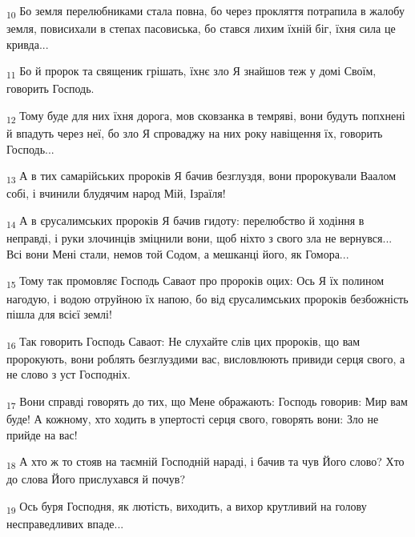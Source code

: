 \begin{tcolorbox}
\textsubscript{10} Бо земля перелюбниками стала повна, бо через прокляття потрапила в жалобу земля, повисихали в степах пасовиська, бо стався лихим їхній біг, їхня сила це кривда...
\end{tcolorbox}
\begin{tcolorbox}
\textsubscript{11} Бо й пророк та священик грішать, їхнє зло Я знайшов теж у домі Своїм, говорить Господь.
\end{tcolorbox}
\begin{tcolorbox}
\textsubscript{12} Тому буде для них їхня дорога, мов сковзанка в темряві, вони будуть попхнені й впадуть через неї, бо зло Я спроваджу на них року навіщення їх, говорить Господь...
\end{tcolorbox}
\begin{tcolorbox}
\textsubscript{13} А в тих самарійських пророків Я бачив безглуздя, вони пророкували Ваалом собі, і вчинили блудячим народ Мій, Ізраїля!
\end{tcolorbox}
\begin{tcolorbox}
\textsubscript{14} А в єрусалимських пророків Я бачив гидоту: перелюбство й ходіння в неправді, і руки злочинців зміцнили вони, щоб ніхто з свого зла не вернувся... Всі вони Мені стали, немов той Содом, а мешканці його, як Гомора...
\end{tcolorbox}
\begin{tcolorbox}
\textsubscript{15} Тому так промовляє Господь Саваот про пророків оцих: Ось Я їх полином нагодую, і водою отруйною їх напою, бо від єрусалимських пророків безбожність пішла для всієї землі!
\end{tcolorbox}
\begin{tcolorbox}
\textsubscript{16} Так говорить Господь Саваот: Не слухайте слів цих пророків, що вам пророкують, вони роблять безглуздими вас, висловлюють привиди серця свого, а не слово з уст Господніх.
\end{tcolorbox}
\begin{tcolorbox}
\textsubscript{17} Вони справді говорять до тих, що Мене ображають: Господь говорив: Мир вам буде! А кожному, хто ходить в упертості серця свого, говорять вони: Зло не прийде на вас!
\end{tcolorbox}
\begin{tcolorbox}
\textsubscript{18} А хто ж то стояв на таємній Господній нараді, і бачив та чув Його слово? Хто до слова Його прислухався й почув?
\end{tcolorbox}
\begin{tcolorbox}
\textsubscript{19} Ось буря Господня, як лютість, виходить, а вихор крутливий на голову несправедливих впаде...
\end{tcolorbox}
